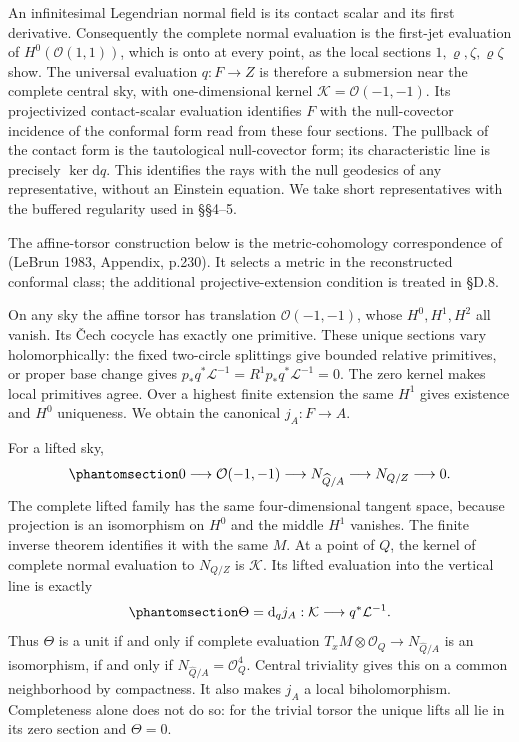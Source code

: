 \documentclass[
  english,
  11pt,
  reqno]{amsart}
\begin{document}
An infinitesimal Legendrian normal field is its contact scalar and its
first derivative. Consequently the complete normal evaluation is the
first-jet evaluation of \(H^0(\mathcal O(1,1))\), which is onto at every
point, as the local sections \(1,\varrho,\zeta,\varrho\zeta\) show. The
universal evaluation \(q:F\to Z\) is therefore a submersion near the
complete central sky, with one-dimensional kernel
\(\mathcal K=\mathcal O(-1,-1)\). Its projectivized contact-scalar
evaluation identifies \(F\) with the null-covector incidence of the
conformal form read from these four sections. The pullback of the
contact form is the tautological null-covector form; its characteristic
line is precisely \(\ker\mathrm dq\). This identifies the rays with the
null geodesics of any representative, without an Einstein equation. We
take short representatives with the buffered regularity used in §§4--5.

The affine-torsor construction below is the metric-cohomology
correspondence of (LeBrun 1983, Appendix, p.230). It selects a metric in
the reconstructed conformal class; the additional projective-extension
condition is treated in §D.8.

On any sky the affine torsor has translation \(\mathcal O(-1,-1)\),
whose \(H^0,H^1,H^2\) all vanish. Its Čech cocycle has exactly one
primitive. These unique sections vary holomorphically: the fixed
two-circle splittings give bounded relative primitives, or proper base
change gives \(p_*q^*\mathcal L^{-1}=R^1p_*q^*\mathcal L^{-1}=0\). The
zero kernel makes local primitives agree. Over a highest finite
extension the same \(H^1\) gives existence and \(H^0\) uniqueness. We
obtain the canonical \(j_A:F\to A\).

For a lifted sky,
\begin{equation}\protect\phantomsection\label{eq:gg-lifted-sky-normal}{
 0\longrightarrow\mathcal O(-1,-1)
 \longrightarrow N_{\widehat Q/A}
 \longrightarrow N_{Q/Z}\longrightarrow0 .
}\end{equation} The complete lifted family has the same four-dimensional
tangent space, because projection is an isomorphism on \(H^0\) and the
middle \(H^1\) vanishes. The finite inverse theorem identifies it with
the same \(M\). At a point of \(Q\), the kernel of complete normal
evaluation to \(N_{Q/Z}\) is \(\mathcal K\). Its lifted evaluation into
the vertical line is exactly
\begin{equation}\protect\phantomsection\label{eq:gg-affine-vertical-derivative}{
 \Theta=\mathrm d_qj_A:\mathcal K\longrightarrow q^*\mathcal L^{-1}.
}\end{equation} Thus \(\Theta\) is a unit if and only if complete
evaluation \(T_xM\otimes\mathcal O_Q\to N_{\widehat Q/A}\) is an
isomorphism, if and only if \(N_{\widehat Q/A}=\mathcal O_Q^4\). Central
triviality gives this on a common neighborhood by compactness. It also
makes \(j_A\) a local biholomorphism. Completeness alone does not do so:
for the trivial torsor the unique lifts all lie in its zero section and
\(\Theta=0\).
\end{document}
